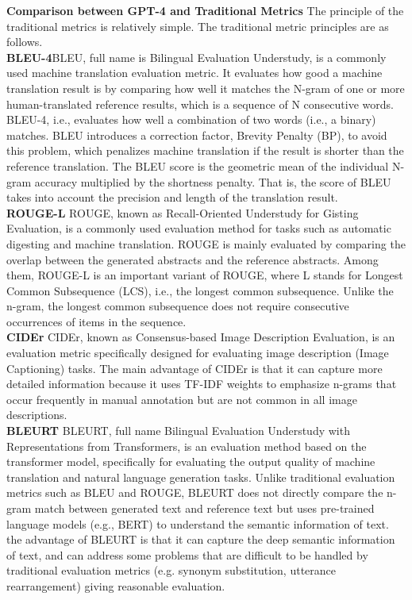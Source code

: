 \noindent\textbf{Comparison between GPT-4 and Traditional Metrics}\quad
The principle of the traditional metrics is relatively simple. The traditional metric principles are as follows.\\
\noindent\textbf{BLEU-4}\quad BLEU, full name is Bilingual Evaluation Understudy, is a commonly used machine translation evaluation metric. It evaluates how good a machine translation result is by comparing how well it matches the N-gram of one or more human-translated reference results, which is a sequence of N consecutive words. BLEU-4, i.e., evaluates how well a combination of two words (i.e., a binary) matches. BLEU introduces a correction factor, Brevity Penalty (BP), to avoid this problem, which penalizes machine translation if the result is shorter than the reference translation. The BLEU score is the geometric mean of the individual N-gram accuracy multiplied by the shortness penalty. That is, the score of BLEU takes into account the precision and length of the translation result.\\
\noindent\textbf{ROUGE-L}\quad
ROUGE, known as Recall-Oriented Understudy for Gisting Evaluation, is a commonly used evaluation method for tasks such as automatic digesting and machine translation. ROUGE is mainly evaluated by comparing the overlap between the generated abstracts and the reference abstracts. Among them, ROUGE-L is an important variant of ROUGE, where L stands for Longest Common Subsequence (LCS), i.e., the longest common subsequence. Unlike the n-gram, the longest common subsequence does not require consecutive occurrences of items in the sequence.
\\
\noindent\textbf{CIDEr}\quad
CIDEr, known as Consensus-based Image Description Evaluation, is an evaluation metric specifically designed for evaluating image description (Image Captioning) tasks. The main advantage of CIDEr is that it can capture more detailed information because it uses TF-IDF weights to emphasize n-grams that occur frequently in manual annotation but are not common in all image descriptions.\\
\noindent\textbf{BLEURT}\quad
BLEURT, full name Bilingual Evaluation Understudy with Representations from Transformers, is an evaluation method based on the transformer model, specifically for evaluating the output quality of machine translation and natural language generation tasks. Unlike traditional evaluation metrics such as BLEU and ROUGE, BLEURT does not directly compare the n-gram match between generated text and reference text but uses pre-trained language models (e.g., BERT) to understand the semantic information of text. the advantage of BLEURT is that it can capture the deep semantic information of text, and can address some problems that are difficult to be handled by traditional evaluation metrics (e.g. synonym substitution, utterance rearrangement) giving reasonable evaluation.\\
